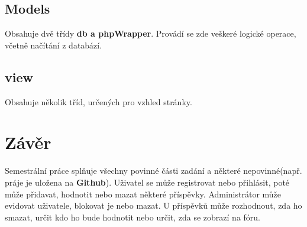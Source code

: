 \documentclass[12pt]{report}
\begin{document}
\section{Models} 
Obsahuje dvě třídy \textbf{db a phpWrapper}. 
Provádí se zde veškeré logické operace, včetně načítání z databází. 
\section{view} 
Obsahuje několik tříd, určených pro vzhled stránky.

\chapter{Závěr}
Semestrální práce splňuje všechny povinné části zadání a některé nepovinné(např. práje je uložena na \textbf{Github}). Uživatel se může registrovat nebo přihlásit, poté může přidavat, hodnotit nebo mazat některé příspěvky. Administrátor může evidovat uživatele, blokovat je nebo mazat. U příspěvků může rozhodnout, zda ho smazat, určit kdo ho bude hodnotit nebo určit, zda se zobrazí na fóru. 
\end{document}
